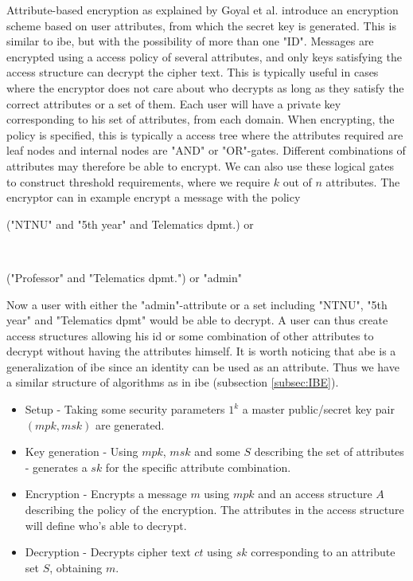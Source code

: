Attribute-based encryption as explained by Goyal et al. \cite{ABE} introduce an encryption scheme based on user attributes, from which the secret key is generated. This is similar to \gls{ibe}, but with the possibility of more than one "ID". Messages are encrypted using a access policy of several attributes, and only keys satisfying the access structure can decrypt the cipher text. This is typically useful in cases where the encryptor does not care about who decrypts as long as they satisfy the correct attributes or a set of them. Each user will have a private key corresponding to his set of attributes, from each domain. When encrypting, the policy is specified, this is typically a access tree where the attributes required are leaf nodes and internal nodes are "AND" or "OR"-gates. Different combinations of attributes may therefore be able to encrypt. We can also use these logical gates to construct threshold requirements, where we require $k$ out of $n$ attributes. The encryptor can in example encrypt a message with the policy\\ \centerline{("NTNU" and "5th year" and Telematics dpmt.) or} \\ \centerline{("Professor" and "Telematics dpmt.") or "admin"}
Now a user with either the "admin"-attribute or a set including "NTNU", "5th year" and "Telematics dpmt" would be able to decrypt. A user can thus create access structures allowing his id or some combination of other attributes to decrypt without having the attributes himself. It is worth noticing that \gls{abe} is a generalization of \gls{ibe} since an identity can be used as an attribute. Thus we have a similar structure of algorithms as in \gls{ibe} (subsection \ref{subsec:IBE}).

\begin{itemize}
\item Setup - Taking some security parameters $1^k$ a master public/secret key pair $(mpk, msk)$ are generated.
\item Key generation - Using $mpk$, $msk$ and some $S$ describing the set of attributes - generates a $sk$ for the specific attribute combination. 
\item Encryption - Encrypts a message $m$ using $mpk$ and an access structure $A$ describing the policy of the encryption. The attributes in the access structure will define who's able to decrypt. 
\item Decryption - Decrypts cipher text $ct$ using $sk$ corresponding to an attribute set $S$, obtaining $m$. 
\end{itemize}


